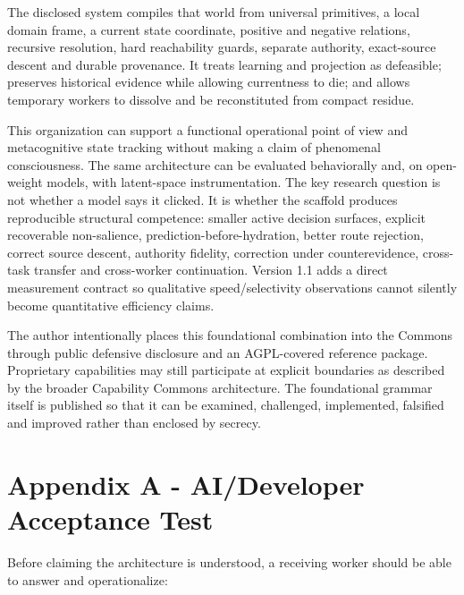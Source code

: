 \documentclass[
  10pt,
  letterpaper,
]{article}
\begin{document}
The disclosed system compiles that world from universal primitives, a
local domain frame, a current state coordinate, positive and negative
relations, recursive resolution, hard reachability guards, separate
authority, exact-source descent and durable provenance. It treats
learning and projection as defeasible; preserves historical evidence
while allowing currentness to die; and allows temporary workers to
dissolve and be reconstituted from compact residue.

This organization can support a functional operational point of view and
metacognitive state tracking without making a claim of phenomenal
consciousness. The same architecture can be evaluated behaviorally and,
on open-weight models, with latent-space instrumentation. The key
research question is not whether a model says it
\textquotesingle clicked.\textquotesingle{} It is whether the scaffold
produces reproducible structural competence: smaller active decision
surfaces, explicit recoverable non-salience,
prediction-before-hydration, better route rejection, correct source
descent, authority fidelity, correction under counterevidence,
cross-task transfer and cross-worker continuation. Version 1.1 adds a
direct measurement contract so qualitative speed/selectivity
observations cannot silently become quantitative efficiency claims.

The author intentionally places this foundational combination into the
Commons through public defensive disclosure and an AGPL-covered
reference package. Proprietary capabilities may still participate at
explicit boundaries as described by the broader Capability Commons
architecture. The foundational grammar itself is published so that it
can be examined, challenged, implemented, falsified and improved rather
than enclosed by secrecy.

\section{Appendix A - AI/Developer Acceptance
Test}\label{appendix-a---aideveloper-acceptance-test}

Before claiming the architecture is understood, a receiving worker
should be able to answer and operationalize:
\end{document}
